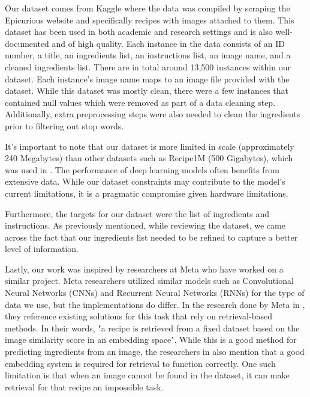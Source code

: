 \documentclass[10pt,twocolumn,letterpaper]{article}
\begin{document}
Our dataset comes from Kaggle \cite{Goel_Desai_Tanvi_2021_Kaggle} where the data was compiled by scraping the Epicurious website and specifically recipes with images attached to them. This dataset has been used in both academic and research settings and is also well-documented and of high quality. Each instance in the data consists of an ID number, a title, an ingredients list, an instructions list, an image name, and a cleaned ingredients list. There are in total around 13,500 instances within our dataset. Each instance's image name maps to an image file provided with the dataset. While this dataset was mostly clean, there were a few instances that contained null values which were removed as part of a data cleaning step. Additionally, extra preprocessing steps were also needed to clean the ingredients prior to filtering out stop words.

It's important to note that our dataset is more limited in scale (approximately 240 Megabytes) than other datasets such as Recipe1M (500 Gigabytes), which was used in \cite{Salvador_Drozdzal_Giro-i-Nieto_Romero_2019_orig_2}. The performance of deep learning models often benefits from extensive data. While our dataset constraints may contribute to the model's current limitations, it is a pragmatic compromise given hardware limitations.

Furthermore, the targets for our dataset were the list of ingredients and instructions. As previously mentioned, while reviewing the dataset, we came across the fact that our ingredients list needed to be refined to capture a better level of information.

Lastly, our work was inspired by researchers at Meta who have worked on a similar project. Meta researchers utilized similar models such as Convolutional Neural Networks (CNNs) and Recurrent Neural Networks (RNNs) for the type of data we use, but the implementations do differ. In the research done by Meta in \cite{Salvador_Drozdzal_Giro-i-Nieto_Romero_2019_orig_2}, they reference existing solutions for this task that rely on retrieval-based methods. In their words, "a recipe is retrieved from a fixed dataset based on the image similarity score in an embedding space". While this is a good method for predicting ingredients from an image, the researchers in \cite{Salvador_Drozdzal_Giro-i-Nieto_Romero_2019_orig_2} also mention that a good embedding system is required for retrieval to function correctly. One such limitation is that when an image cannot be found in the dataset, it can make retrieval for that recipe an impossible task.
\end{document}
